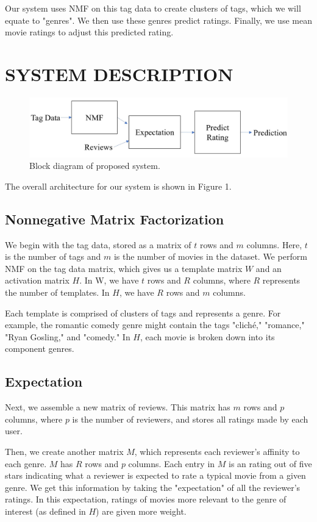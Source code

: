 \documentclass[letterpaper, 10 pt, conference]{ieeeconf}  %
\begin{document}
Our system uses NMF on this tag data to create clusters of tags, which we will equate to "genres". We then use these genres predict ratings. Finally, we use mean movie ratings to adjust this predicted rating.


\section{SYSTEM DESCRIPTION}

\begin{figure}[h]
   \includegraphics[scale=0.5]{./figs/blockdiagram.jpg}
   \caption{Block diagram of proposed system.}
\end{figure}

The overall architecture for our system is shown in Figure 1.

\subsection{Nonnegative Matrix Factorization}

We begin with the tag data, stored as a matrix of $t$ rows and $m$ columns. Here, $t$ is the number of tags and $m$ is the number of movies in the dataset.
We perform NMF on the tag data matrix, which gives us a template matrix $W$ and an activation matrix $H$.
In W, we have $t$ rows and $R$ columns, where $R$ represents the number of templates. In $H$, we have $R$ rows and $m$ columns.

Each template is comprised of clusters of tags and represents a genre. For example, the romantic comedy genre might contain the tags "cliché," "romance," "Ryan Gosling," and "comedy." In $H$, each movie is broken down into its component genres.

\subsection{Expectation}

Next, we assemble a new matrix of reviews. This matrix has $m$ rows and $p$ columns, where $p$ is the number of reviewers, and stores all ratings made by each user.

Then, we create another matrix $M$, which represents each reviewer's affinity to each genre. 
$M$ has $R$ rows and $p$ columns. Each entry in $M$ is an rating out of five stars indicating what a reviewer is expected to rate a typical movie from a given genre.
We get this information by taking the "expectation" of all the reviewer's ratings. In this expectation, ratings of movies more relevant to the genre of interest (as defined in $H$) are given more weight.
\end{document}
